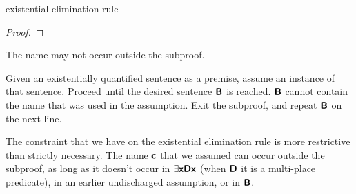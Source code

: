 	\begin{quote}
	\end{quote}

\begin{factboxy}{existential elimination rule}
\begin{proof}
	\open
		 \as{}
	\close
	 
\end{proof}

\small{The name  may not occur outside the subproof.\smallskip

Given an existentially quantified sentence as a premise, assume an instance of that sentence. Proceed until the desired sentence $\bm{\mathsf{B}}$ is reached. $\bm{\mathsf{B}}$ cannot contain the name that was used in the assumption. Exit the subproof, and repeat $\bm{\mathsf{B}}$ on the next line.
}
\end{factboxy}



\begin{notebox}
The constraint that we have on the existential elimination rule is more restrictive than strictly necessary. The name $\bm{\mathsf{c}}$ that we assumed can occur outside the subproof, as long as it doesn't occur in $\exists \bm{\mathsf{x}}\bm{\mathsf{Dx}}$ (when $\bm{\mathsf{D}}$ it is a multi-place predicate), in an earlier undischarged assumption, or in $\bm{\mathsf{B}}$.
\end{notebox}


